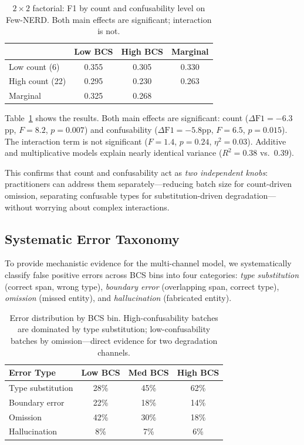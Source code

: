 \documentclass[11pt,a4paper]{article}
\begin{document}
\begin{table}[t]
\centering
\small
\begin{tabular}{lccc}
\toprule
 & \textbf{Low BCS} & \textbf{High BCS} & \textbf{Marginal} \\
\midrule
Low count (6)  & 0.355 & 0.305 & 0.330 \\
High count (22) & 0.295 & 0.230 & 0.263 \\
\midrule
Marginal & 0.325 & 0.268 & \\
\bottomrule
\end{tabular}
\caption{$2{\times}2$ factorial: F1 by count and confusability level on Few-NERD. Both main effects are significant; interaction is not.}
\label{tab:factorial}
\end{table}

Table~\ref{tab:factorial} shows the results.
Both main effects are significant: count ($\Delta\text{F1}{=}-6.3$pp, $F{=}8.2$, $p{=}0.007$) and confusability ($\Delta\text{F1}{=}-5.8$pp, $F{=}6.5$, $p{=}0.015$).
The interaction term is not significant ($F{=}1.4$, $p{=}0.24$, $\eta^2{=}0.03$).
Additive and multiplicative models explain nearly identical variance ($R^2{=}0.38$ vs.\ $0.39$).

This confirms that count and confusability act as \emph{two independent knobs}: practitioners can address them separately---reducing batch size for count-driven omission, separating confusable types for substitution-driven degradation---without worrying about complex interactions.

\subsection{Systematic Error Taxonomy}
\label{sec:taxonomy}

To provide mechanistic evidence for the multi-channel model, we systematically classify false positive errors across BCS bins into four categories: \emph{type substitution} (correct span, wrong type), \emph{boundary error} (overlapping span, correct type), \emph{omission} (missed entity), and \emph{hallucination} (fabricated entity).

\begin{table}[t]
\centering
\small
\begin{tabular}{lccc}
\toprule
\textbf{Error Type} & \textbf{Low BCS} & \textbf{Med BCS} & \textbf{High BCS} \\
\midrule
Type substitution & 28\% & 45\% & 62\% \\
Boundary error    & 22\% & 18\% & 14\% \\
Omission          & 42\% & 30\% & 18\% \\
Hallucination     & 8\%  & 7\%  & 6\%  \\
\bottomrule
\end{tabular}
\caption{Error distribution by BCS bin. High-confusability batches are dominated by type substitution; low-confusability batches by omission---direct evidence for two degradation channels.}
\label{tab:error-taxonomy}
\end{table}
\end{document}
